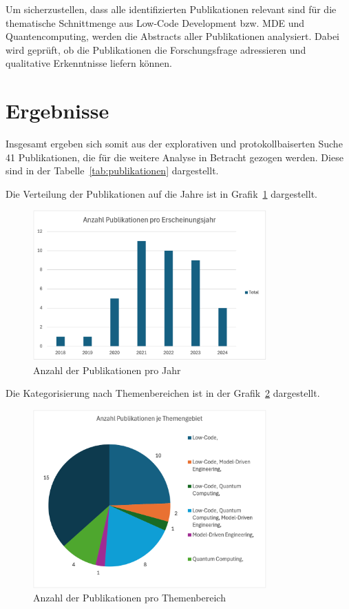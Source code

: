 Um sicherzustellen, dass alle identifizierten Publikationen relevant sind für die thematische Schnittmenge aus Low-Code Development bzw. 
MDE und Quantencomputing, werden die Abstracts aller Publikationen analysiert. Dabei wird geprüft, ob die Publikationen die 
Forschungsfrage adressieren und qualitative Erkenntnisse liefern können. 

\section{Ergebnisse}
Insgesamt ergeben sich somit aus der explorativen und protokollbaiserten Suche 41 Publikationen, die für die weitere Analyse 
in Betracht gezogen werden. Diese sind in der Tabelle~\ref{tab:publikationen} dargestellt. 

Die Verteilung der Publikationen auf die Jahre ist in Grafik~\ref{fig:publications_per_year} dargestellt.

\begin{figure}[h!]
    \centering
    \includegraphics[width=0.8\textwidth]{graphics/anzahl_pubs_jahr.png}
    \caption{Anzahl der Publikationen pro Jahr}
    \label{fig:publications_per_year}
\end{figure}

Die Kategorisierung nach Themenbereichen ist in der Grafik~\ref{fig:publications_per_topic} dargestellt.

\begin{figure}[h!]
    \centering
    \includegraphics[width=0.8\textwidth]{graphics/anzahl_themen_pubs.png}
    \caption{Anzahl der Publikationen pro Themenbereich}
    \label{fig:publications_per_topic}
\end{figure}

